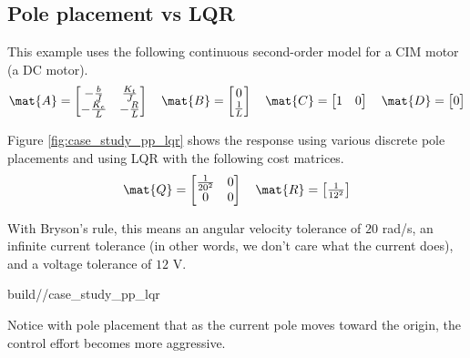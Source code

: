 \subsection{Pole placement vs LQR}

This example uses the following continuous second-order \gls{model} for a CIM
motor (a DC motor).
\begin{align*}
  \mat{A} = \begin{bmatrix}
    -\frac{b}{J} & \frac{K_t}{J} \\
    -\frac{K_e}{L} & -\frac{R}{L}
  \end{bmatrix}
  \quad
  \mat{B} = \begin{bmatrix}
    0 \\
    \frac{1}{L}
  \end{bmatrix}
  \quad
  \mat{C} = \begin{bmatrix}
    1 & 0
  \end{bmatrix}
  \quad
  \mat{D} = \begin{bmatrix}
    0
  \end{bmatrix}
\end{align*}

Figure \ref{fig:case_study_pp_lqr} shows the response using various discrete
pole placements and using LQR with the following cost matrices.
\begin{align*}
  \mat{Q} = \begin{bmatrix}
    \frac{1}{20^2} & 0 \\
    0 & 0
  \end{bmatrix}
  \quad
  \mat{R} = \begin{bmatrix}
    \frac{1}{12^2}
  \end{bmatrix}
\end{align*}

With Bryson's rule, this means an angular velocity tolerance of $20$ rad/s, an
infinite current tolerance (in other words, we don't care what the current
does), and a voltage tolerance of $12$ V.
\begin{svg}{build/\chapterpath/case_study_pp_lqr}
  \caption{Second-order CIM motor response with pole placement and LQR}
  \label{fig:case_study_pp_lqr}
\end{svg}

Notice with pole placement that as the current pole moves toward the origin, the
\gls{control effort} becomes more aggressive.
